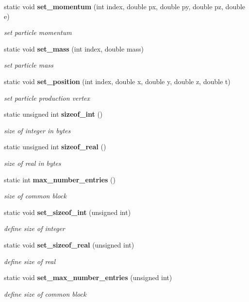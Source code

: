 \begin{CompactItemize}
static void {\bf set\_\-momentum} (int index, double px, double py, double pz, double e)
\begin{CompactList}\small\item\em set particle momentum \item\end{CompactList}\item 
static void {\bf set\_\-mass} (int index, double mass)
\begin{CompactList}\small\item\em set particle mass \item\end{CompactList}\item 
static void {\bf set\_\-position} (int index, double x, double y, double z, double t)
\begin{CompactList}\small\item\em set particle production vertex \item\end{CompactList}\item 
static unsigned int {\bf sizeof\_\-int} ()
\begin{CompactList}\small\item\em size of integer in bytes \item\end{CompactList}\item 
static unsigned int {\bf sizeof\_\-real} ()
\begin{CompactList}\small\item\em size of real in bytes \item\end{CompactList}\item 
static int {\bf max\_\-number\_\-entries} ()
\begin{CompactList}\small\item\em size of common block \item\end{CompactList}\item 
static void {\bf set\_\-sizeof\_\-int} (unsigned int)
\begin{CompactList}\small\item\em define size of integer \item\end{CompactList}\item 
static void {\bf set\_\-sizeof\_\-real} (unsigned int)
\begin{CompactList}\small\item\em define size of real \item\end{CompactList}\item 
static void {\bf set\_\-max\_\-number\_\-entries} (unsigned int)
\begin{CompactList}\small\item\em define size of common block \item\end{CompactList}\end{CompactItemize}
